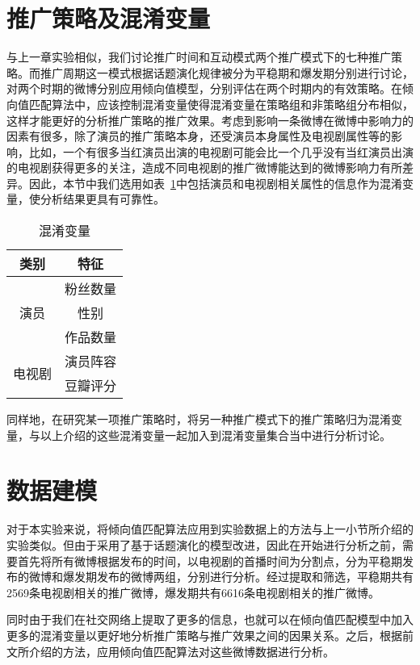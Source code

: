\section{推广策略及混淆变量}

与上一章实验相似，我们讨论推广时间和互动模式两个推广模式下的七种推广策略。而推广周期这一模式根据话题演化规律被分为平稳期和爆发期分别进行讨论，对两个时期的微博分别应用倾向值模型，分别评估在两个时期内的有效策略。在倾向值匹配算法中，应该控制混淆变量使得混淆变量在策略组和非策略组分布相似，这样才能更好的分析推广策略的推广效果。考虑到影响一条微博在微博中影响力的因素有很多，除了演员的推广策略本身，还受演员本身属性及电视剧属性等的影响，比如，一个有很多当红演员出演的电视剧可能会比一个几乎没有当红演员出演的电视剧获得更多的关注，造成不同电视剧的推广微博能达到的微博影响力有所差异。因此，本节中我们选用如表~\ref{mul}中包括演员和电视剧相关属性的信息作为混淆变量，使分析结果更具有可靠性。

\begin{table}[!htbp]
\centering
\caption{混淆变量}
\label{mul}
\begin{tabular}{|c|c|} \hline
类别 & 特征\\ \hline
\multirow{3}{*}{演员} & 粉丝数量\\%
& 性别\\%
& 作品数量\\ \hline
\multirow{2}{*}{电视剧} & 演员阵容\\%
&豆瓣评分 \\ \hline
\end{tabular}
\end{table}

同样地，在研究某一项推广策略时，将另一种推广模式下的推广策略归为混淆变量，与以上介绍的这些混淆变量一起加入到混淆变量集合当中进行分析讨论。

\section{数据建模}

对于本实验来说，将倾向值匹配算法应用到实验数据上的方法与上一小节所介绍的实验类似。但由于采用了基于话题演化的模型改进，因此在开始进行分析之前，需要首先将所有微博根据发布的时间，以电视剧的首播时间为分割点，分为平稳期发布的微博和爆发期发布的微博两组，分别进行分析。经过提取和筛选，平稳期共有2569条电视剧相关的推广微博，爆发期共有6616条电视剧相关的推广微博。

同时由于我们在社交网络上提取了更多的信息，也就可以在倾向值匹配模型中加入更多的混淆变量以更好地分析推广策略与推广效果之间的因果关系。之后，根据前文所介绍的方法，应用倾向值匹配算法对这些微博数据进行分析。

